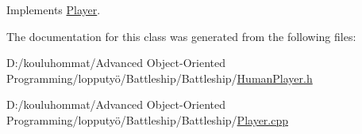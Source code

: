 Implements \mbox{\hyperlink{class_player_a368527cfefaac58dc942b32658f977ed}{Player}}.



The documentation for this class was generated from the following files\+:\begin{DoxyCompactItemize}
\item 
D\+:/kouluhommat/\+Advanced Object-\/\+Oriented Programming/lopputyö/\+Battleship/\+Battleship/\mbox{\hyperlink{_human_player_8h}{Human\+Player.\+h}}\item 
D\+:/kouluhommat/\+Advanced Object-\/\+Oriented Programming/lopputyö/\+Battleship/\+Battleship/\mbox{\hyperlink{_player_8cpp}{Player.\+cpp}}\end{DoxyCompactItemize}
